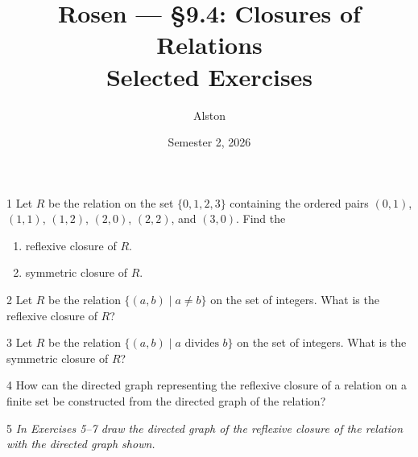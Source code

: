 \documentclass[11pt]{article}
\title{Rosen --- \S 9.4: Closures of Relations\\ \large Selected Exercises}
\author{Alston}
\date{Semester 2, 2026}
\begin{document}
\maketitle

\begin{exercise}{1}
    Let $R$ be the relation on the set $\{0, 1, 2, 3\}$ containing the
    ordered pairs $(0,1)$, $(1,1)$, $(1,2)$, $(2,0)$, $(2,2)$, and
    $(3,0)$. Find the
    \begin{enumerate}[label=(\alph*)]
        \item reflexive closure of $R$.
        \item symmetric closure of $R$.
    \end{enumerate}
\end{exercise}

\begin{exercise}{2}
    Let $R$ be the relation $\{(a,b) \mid a \neq b\}$ on the set of
    integers. What is the reflexive closure of $R$?
\end{exercise}

\begin{exercise}{3}
    Let $R$ be the relation $\{(a,b) \mid a \text{ divides } b\}$ on
    the set of integers. What is the symmetric closure of $R$?
\end{exercise}

\begin{exercise}{4}
    How can the directed graph representing the reflexive closure of
    a relation on a finite set be constructed from the directed graph
    of the relation?
\end{exercise}

\begin{exercise}{5}
    \textit{In Exercises 5--7 draw the directed graph of the reflexive
    closure of the relation with the directed graph shown.}

    \begin{center}
    \end{center}
\end{exercise}
\end{document}
